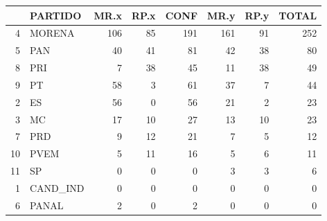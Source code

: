 \begin{table}[ht]
\centering
\begin{tabular}{rlrrrrrr}
  \hline
 & PARTIDO & MR.x & RP.x & CONF & MR.y & RP.y & TOTAL \\ 
  \hline
4 & MORENA & 106 & 85 & 191 & 161 & 91 & 252 \\ 
  5 & PAN & 40 & 41 & 81 & 42 & 38 & 80 \\ 
  8 & PRI & 7 & 38 & 45 & 11 & 38 & 49 \\ 
  9 & PT & 58 & 3 & 61 & 37 & 7 & 44 \\ 
  2 & ES & 56 & 0 & 56 & 21 & 2 & 23 \\ 
  3 & MC & 17 & 10 & 27 & 13 & 10 & 23 \\ 
  7 & PRD & 9 & 12 & 21 & 7 & 5 & 12 \\ 
  10 & PVEM & 5 & 11 & 16 & 5 & 6 & 11 \\ 
  11 & SP & 0 & 0 & 0 & 3 & 3 & 6 \\ 
  1 & CAND\_IND & 0 & 0 & 0 & 0 & 0 & 0 \\ 
  6 & PANAL & 2 & 0 & 2 & 0 & 0 & 0 \\ 
   \hline
\end{tabular}
\end{table}
